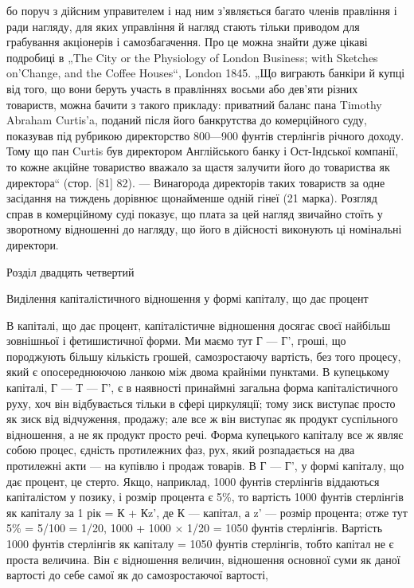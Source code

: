 \parcont{}  %
бо поруч з дійсним управителем і над ним з’являється багато
членів правління і ради нагляду, для яких управління й нагляд
стають тільки приводом для грабування акціонерів і самозбагачення.
Про це можна знайти дуже цікаві подробиці в „The
City or the Physiology of London Business; with Sketches on’Change,
and the Coffee Houses“, London 1845. „Що виграють банкіри
й купці від того, що вони беруть участь в правліннях
восьми або дев’яти різних товариств, можна бачити з такого
прикладу: приватний баланс пана Timothy Abraham Curtis’a, поданий
після його банкрутства до комерційного суду, показував
під рубрикою директорство 800—900 фунтів стерлінгів річного
доходу. Тому що пан Curtis був директором Англійського банку
і Ост-Індської компанії, то кожне акційне товариство вважало за
щастя залучити його до товариства як директора“ (стор. [81] 82). —
Винагорода директорів таких товариств за одне засідання на
тиждень дорівнює щонайменше одній гінеї (21 марка). Розгляд
справ в комерційному суді показує, що плата за цей нагляд
звичайно стоїть у зворотному відношенні до нагляду, що його
в дійсності виконують ці номінальні директори.

Розділ двадцять четвертий

Виділення капіталістичного відношення у формі
капіталу, що дає процент

В капіталі, що дає процент, капіталістичне відношення досягає
своєї найбільш зовнішньої і фетишистичної форми. Ми
маємо тут Г — Г', гроші, що породжують більшу кількість грошей,
самозростаючу вартість, без того процесу, який є опосереднюючою
ланкою між двома крайніми пунктами. В купецькому
капіталі, Г — Т — Г', є в наявності принаймні загальна форма
капіталістичного руху, хоч він відбувається тільки в сфері циркуляції;
тому зиск виступає просто як зиск від відчуження, продажу;
але все ж він виступає як продукт суспільного відношення, а не
як продукт просто речі. Форма купецького капіталу все ж
являє собою процес, єдність протилежних фаз, рух, який розпадається
на два протилежні акти — на купівлю і продаж товарів.
В Г — Г', у формі капіталу, що дає процент, це стерто. Якщо,
наприклад, 1000 фунтів стерлінгів віддаються капіталістом у позику,
і розмір процента є 5\%, то вартість 1000 фунтів стерлінгів
як капіталу за 1 рік = К + Кz', де К — капітал, а z' —
розмір процента; отже тут 5\% = 5/100 = 1/20, 1000 + 1000 × 1/20 =
1050 фунтів стерлінгів. Вартість 1000 фунтів стерлінгів як
капіталу = 1050 фунтів стерлінгів, тобто капітал не є проста
величина. Він є відношення величин, відношення основної суми
як даної вартості до себе самої як до самозростаючої вартості,
\parbreak{}  %
